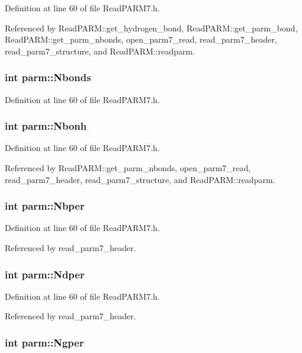 Definition at line 60 of file Read\-PARM7.h.

Referenced by Read\-PARM::get\_\-hydrogen\_\-bond, Read\-PARM::get\_\-parm\_\-bond, Read\-PARM::get\_\-parm\_\-nbonds, open\_\-parm7\_\-read, read\_\-parm7\_\-header, read\_\-parm7\_\-structure, and Read\-PARM::readparm.
\subsubsection{\setlength{\rightskip}{0pt plus 5cm}int parm::Nbonds}\label{structparm_m89}




Definition at line 60 of file Read\-PARM7.h.
\subsubsection{\setlength{\rightskip}{0pt plus 5cm}int parm::Nbonh}\label{structparm_m6}




Definition at line 60 of file Read\-PARM7.h.

Referenced by Read\-PARM::get\_\-parm\_\-nbonds, open\_\-parm7\_\-read, read\_\-parm7\_\-header, read\_\-parm7\_\-structure, and Read\-PARM::readparm.
\subsubsection{\setlength{\rightskip}{0pt plus 5cm}int parm::Nbper}\label{structparm_m93}




Definition at line 60 of file Read\-PARM7.h.

Referenced by read\_\-parm7\_\-header.
\subsubsection{\setlength{\rightskip}{0pt plus 5cm}int parm::Ndper}\label{structparm_m95}




Definition at line 60 of file Read\-PARM7.h.

Referenced by read\_\-parm7\_\-header.
\subsubsection{\setlength{\rightskip}{0pt plus 5cm}int parm::Ngper}\label{structparm_m94}




